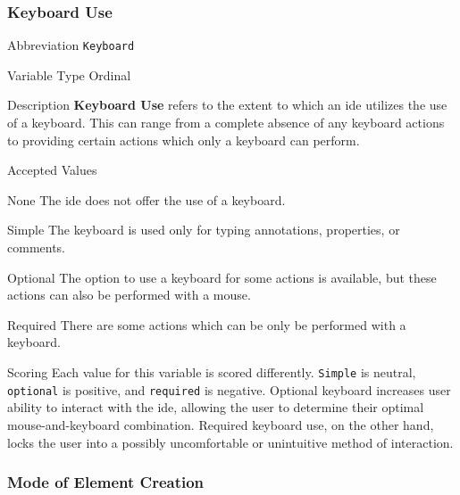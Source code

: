 \subsubsection{Keyboard Use}
\label{subsubsec:keyboard}

\begin{AlignedDesc}
  \item[Abbreviation] \texttt{Keyboard}

  \item[Variable Type] Ordinal

  \item[Description] \textbf{Keyboard Use} refers to the extent to which an
  \ac{ide} utilizes the use of a keyboard. This can range from a complete
  absence of any keyboard actions to providing certain actions which only a
  keyboard can perform.

  \item[Accepted Values]

  \begin{AlignedDesc}
    \item[None] The \ac{ide} does not offer the use of a keyboard.
    \item[Simple] The keyboard is used only for typing annotations,
      properties, or comments.
    \item[Optional] The option to use a keyboard for some actions is
    available, but these actions can also be performed with a mouse.
    \item[Required] There are some actions which can be only be performed
    with a keyboard.
  \end{AlignedDesc}

  \item[Scoring] Each value for this variable is scored differently.
  \texttt{Simple} is neutral, \texttt{optional} is positive, and
  \texttt{required} is negative.  Optional keyboard increases user ability
  to interact with the \ac{ide}, allowing the user to determine their
  optimal mouse-and-keyboard combination. Required keyboard use, on the
  other hand, locks the user into a possibly uncomfortable or unintuitive
  method of interaction.

\end{AlignedDesc}

\subsubsection{Mode of Element Creation}
\label{subsubsec:mode}

